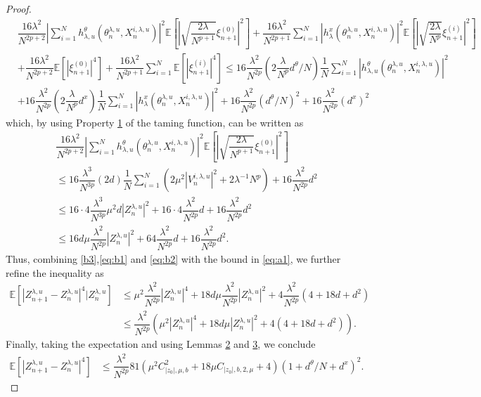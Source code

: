 \documentclass[a4paper, 10pt]{article}
\theoremstyle{plain}%
\begin{document}
\begin{proof}
\begin{align}
&\dfrac{16\lambda^2}{N^{2p+2}}\left|\sum_{i=1}^Nh^{\theta}_{\lambda,u}(\theta_n^{\lambda,u},X_n^{i,\lambda,u})\right|^2\mathbb{E}\left[|\sqrt{\dfrac{2\lambda}{N^{p+1}}}\xi_{n+1}^{(0)}|^2\right]+\dfrac{16\lambda^2}{N^{2p+1}}\sum_{i=1}^N|h^{x}_{\lambda}(\theta_n^{\lambda,u},X_n^{i,\lambda,u})|^2\mathbb{E}\left[|\sqrt{\dfrac{2\lambda}{N^p}}\xi_{n+1}^{(i)} |^2\right]\nonumber\\&+\dfrac{16\lambda^2}{N^{2p+2}}\mathbb{E}\left[|\xi_{n+1}^{(0)}|^4\right]+\dfrac{16\lambda^2}{N^{2p+1}}\sum_{i=1}^N\mathbb{E}\left[|\xi_{n+1}^{(i)}|^4\right]\leq 16\dfrac{\lambda^2}{N^{2p}}\left(2\dfrac{\lambda}{N^p} d^{\theta}/N\right)\dfrac{1}{N}\sum_{i=1}^N|h^{\theta}_{\lambda,u}(\theta_n^{\lambda,u},X_n^{i,\lambda,u})|^2\nonumber\\&+16\dfrac{\lambda^2}{N^{2p}}\left(2\dfrac{\lambda}{N^p} d^x\right)\dfrac{1}{N}\sum_{i=1}^N|h^{x}_{\lambda}(\theta_n^{\lambda,u},X_n^{i,\lambda,u})|^2+16\dfrac{\lambda^2}{N^{2p}}(d^{\theta}/N)^2+16\dfrac{\lambda^2}{N^{2p}}(d^x)^2\nonumber
\end{align}
which, by using Property \hyperlink{Property1}{1} of the taming function, can be written as \begin{align}
&\dfrac{16\lambda^2}{N^{2p+2}}\left|\sum_{i=1}^Nh^{\theta}_{\lambda,u}(\theta_n^{\lambda,u},X_n^{i,\lambda,u})\right|^2\mathbb{E}\left[|\sqrt{\dfrac{2\lambda}{N^{p+1}}}\xi_{n+1}^{(0)}|^2\right]\nonumber\\
&\leq 16\dfrac{\lambda^3}{N^{3p}}(2d)\dfrac{1}{N}\sum_{i=1}^N\left(2\mu^2|V_n^{i,\lambda,u}|^2+2\lambda^{-1}N^p\right)+16\dfrac{\lambda^2}{N^{2p}}d^2\nonumber\\
&\leq 16\cdot 4\dfrac{\lambda^3}{N^{3p}}\mu^2 d|Z^{\lambda,u}_{n}|^2+16\cdot 4\dfrac{\lambda^2}{N^{2p}} d+16\dfrac{\lambda^2}{N^{2p}} d^2\nonumber\\
&\leq  16d\mu\dfrac{\lambda^2}{N^{2p}}|Z^{\lambda,u}_{n}|^2+64\dfrac{\lambda^2}{N^{2p}} d+16\dfrac{\lambda^2}{N^{2p}} d^2.\label{eq:b2}
\end{align}
Thus, combining \eqref{b3},\eqref{eq:b1} and \eqref{eq:b2} with the bound in \eqref{eq:a1}, we further refine the inequality as 
\begin{align*}
\mathbb{E}\left[|Z^{\lambda,u}_{n+1}-Z^{\lambda,u}_{n}|^4|Z^{\lambda,u}_{n}\right]&\leq \mu^2\dfrac{\lambda^2}{N^{2p}}|Z^{\lambda,u}_{n}|^4+18d\mu\dfrac{\lambda^2}{N^{2p}}|Z^{\lambda,u}_{n}|^2+4\dfrac{\lambda^2}{N^{2p}}(4+18d+d^2)\\
&\leq \dfrac{\lambda^2}{N^{2p}}\left(\mu^2|Z^{\lambda,u}_{n}|^4+18d\mu|Z^{\lambda,u}_{n}|^2+4(4+18d+d^2)\right).
\end{align*}
Finally, taking the expectation and using Lemmas \hyperlink{lemma1}{2} and  \hyperlink{lemma2}{3}, we conclude
\begin{align*}
\mathbb{E}\left[|Z^{\lambda,u}_{n+1}-Z^{\lambda,u}_{n}|^4\right]&\leq \dfrac{\lambda^2}{N^{2p}}81\left(\mu^2C^2_{|z_0|,\mu,b}+18\mu C_{|z_0|,b,2,\mu}+4\right)(1+d^{\theta}/N+d^x)^2.
\end{align*}
\end{proof}
\end{document}
